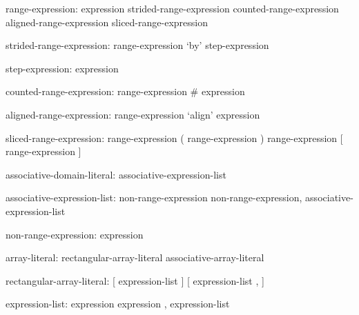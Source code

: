 \begin{syntax}
range-expression:
  expression
  strided-range-expression
  counted-range-expression
  aligned-range-expression
  sliced-range-expression
\end{syntax}

\begin{syntax}
strided-range-expression:
  range-expression `by' step-expression
\end{syntax}

\begin{syntax}
step-expression:
  expression
\end{syntax}

\begin{syntax}
counted-range-expression:
  range-expression # expression
\end{syntax}

\begin{syntax}
aligned-range-expression:
  range-expression `align' expression
\end{syntax}

\begin{syntax}
sliced-range-expression:
  range-expression ( range-expression )
  range-expression [ range-expression ]
\end{syntax}

\begin{syntax}
associative-domain-literal:
   { associative-expression-list }
\end{syntax}

\begin{syntax}
associative-expression-list:
   non-range-expression
   non-range-expression, associative-expression-list
\end{syntax}

\begin{syntax}
non-range-expression:
   expression
\end{syntax}

\begin{syntax}
array-literal:
  rectangular-array-literal
  associative-array-literal
\end{syntax}

\begin{syntax}
rectangular-array-literal:
  [ expression-list ]
  [ expression-list , ]
\end{syntax}

\begin{syntax}
expression-list:
  expression
  expression , expression-list
\end{syntax}

